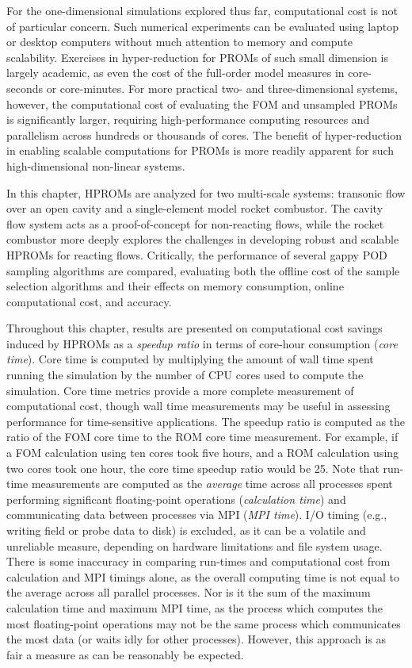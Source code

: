 For the one-dimensional simulations explored thus far, computational cost is not of particular concern. Such numerical experiments can be evaluated using laptop or desktop computers without much attention to memory and compute scalability. Exercises in hyper-reduction for PROMs of such small dimension is largely academic, as even the cost of the full-order model measures in core-seconds or core-minutes. For more practical two- and three-dimensional systems, however, the computational cost of evaluating the FOM and unsampled PROMs is significantly larger, requiring high-performance computing resources and parallelism across hundreds or thousands of cores. The benefit of hyper-reduction in enabling scalable computations for PROMs is more readily apparent for such high-dimensional non-linear systems.

In this chapter, HPROMs are analyzed for two multi-scale systems: transonic flow over an open cavity and a single-element model rocket combustor. The cavity flow system acts as a proof-of-concept for non-reacting flows, while the rocket combustor more deeply explores the challenges in developing robust and scalable HPROMs for reacting flows. Critically, the performance of several gappy POD sampling algorithms are compared, evaluating both the offline cost of the sample selection algorithms and their effects on memory consumption, online computational cost, and accuracy.

Throughout this chapter, results are presented on computational cost savings induced by HPROMs as a \textit{speedup ratio} in terms of core-hour consumption (\textit{core time}). Core time is computed by multiplying the amount of wall time spent running the simulation by the number of CPU cores used to compute the simulation. Core time metrics provide a more complete measurement of computational cost, though wall time measurements may be useful in assessing performance for time-sensitive applications. The speedup ratio is computed as the ratio of the FOM core time to the ROM core time measurement. For example, if a FOM calculation using ten cores took five hours, and a ROM calculation using two cores took one hour, the core time speedup ratio would be 25. Note that run-time measurements are computed as the \textit{average} time across all processes spent performing significant floating-point operations (\textit{calculation time}) and communicating data between processes via MPI (\textit{MPI time}). I/O timing (e.g., writing field or probe data to disk) is excluded, as it can be a volatile and unreliable measure, depending on hardware limitations and file system usage. There is some inaccuracy in comparing run-times and computational cost from calculation and MPI timings alone, as the overall computing time is not equal to the average across all parallel processes. Nor is it the sum of the maximum calculation time and maximum MPI time, as the process which computes the most floating-point operations may not be the same process which communicates the most data (or waits idly for other processes). However, this approach is as fair a measure as can be reasonably be expected.

